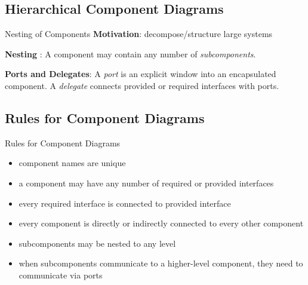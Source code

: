 \subsection{Hierarchical Component Diagrams}
\begin{frame}[label=nestedcomponentsslide]{\insertsubsection}
	\begin{fancycolumns}[animation=none]
		\begin{definition}{Nesting of Components}
			\textbf{Motivation}: decompose/structure large systems
			
			\textbf{Nesting} : A component may contain any number of \emph{subcomponents}. 
			
			\textbf{Ports and Delegates}: A \emph{port} is an explicit window into an encapsulated component. A \emph{delegate} connects provided or required interfaces with ports. 
		\end{definition}
		\nextcolumn
	\end{fancycolumns}
\end{frame}

\subsection{Rules for Component Diagrams}
\begin{frame}{\insertsubsection}
	\begin{fancycolumns}
		\begin{note}{Rules for Component Diagrams}
			\begin{itemize}
				\item component names are unique
				\item a component may have any number of required or provided interfaces
				\item every required interface is connected to provided interface
				\item every component is directly or indirectly connected to every other component
				\item subcomponents may be nested to any level
				\item when subcomponents communicate to a higher-level component, they need to communicate via ports
			\end{itemize}
		\end{note}
	\end{fancycolumns}
\end{frame}

